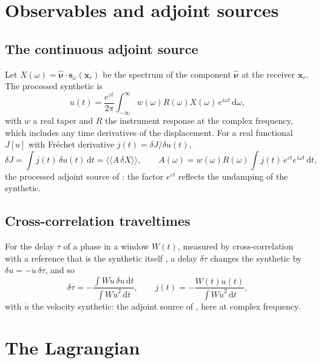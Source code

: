 \documentclass[11pt,a4paper]{article}
\newcommand{\bs}{\mathbf{s}}
\newcommand{\bnu}{\hat{\bm{\nu}}}
\newcommand{\bx}{\mathbf{x}}
\newcommand{\dd}{\,\mathrm{d}}
\theoremstyle{remark}
\begin{document}
\section{Observables and adjoint sources}\label{sec:observables}

\subsection{The continuous adjoint source}

Let $X(\omega) = \bnu\cdot\bs_\omega(\bx_r)$ be the spectrum of the
component $\bnu$ at the receiver $\bx_r$. The processed synthetic is
\begin{equation}
  u(t) = \frac{e^{\varepsilon t}}{2\pi}\int_{-\infty}^\infty w(\omega)
  R(\omega)X(\omega)\,e^{i\omega t}\dd\omega, \label{eq:synthetic}
\end{equation}
with $w$ a real taper and $R$ the instrument response at the complex
frequency, which includes any time derivatives of the displacement. For a
real functional $J[u]$ with Fr\'echet derivative $j(t) = \delta J/\delta
u(t)$,
\begin{equation}
  \delta J = \int j(t)\,\delta u(t)\dd t
  = \langle\!\langle A\,\delta X\rangle\!\rangle, \qquad
  A(\omega) = w(\omega)R(\omega)\int j(t)\,e^{\varepsilon t}e^{i\omega t}
  \dd t, \label{eq:A}
\end{equation}
the processed adjoint source of \citet[][eqs~37--38]{Adourian2024}: the
factor $e^{\varepsilon t}$ reflects the undamping of the synthetic.

\subsection{Cross-correlation traveltimes}

For the delay $\tau$ of a phase in a window $W(t)$, measured by
cross-correlation with a reference that is the synthetic itself
\citep{Dahlen2000}, a delay $\delta\tau$ changes the synthetic by
$\delta u = -\dot u\,\delta\tau$, and so
\begin{equation}
  \delta\tau = -\frac{\int W\dot u\,\delta u\dd t}{\int W\dot u^2\dd t},
  \qquad j(t) = -\frac{W(t)\dot u(t)}{\int W\dot u^2\dd t},
  \label{eq:traveltime}
\end{equation}
with $\dot u$ the velocity synthetic: the adjoint source of
\citet[][eqs~82--83]{LiuTromp2008}, here at complex frequency.

\section{The Lagrangian}\label{sec:adjoint}
\end{document}
